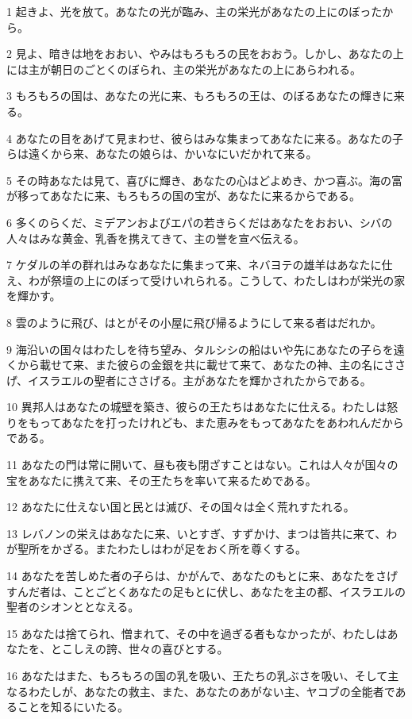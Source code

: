 \par 1 起きよ、光を放て。あなたの光が臨み、主の栄光があなたの上にのぼったから。
\par 2 見よ、暗きは地をおおい、やみはもろもろの民をおおう。しかし、あなたの上には主が朝日のごとくのぼられ、主の栄光があなたの上にあらわれる。
\par 3 もろもろの国は、あなたの光に来、もろもろの王は、のぼるあなたの輝きに来る。
\par 4 あなたの目をあげて見まわせ、彼らはみな集まってあなたに来る。あなたの子らは遠くから来、あなたの娘らは、かいなにいだかれて来る。
\par 5 その時あなたは見て、喜びに輝き、あなたの心はどよめき、かつ喜ぶ。海の富が移ってあなたに来、もろもろの国の宝が、あなたに来るからである。
\par 6 多くのらくだ、ミデアンおよびエパの若きらくだはあなたをおおい、シバの人々はみな黄金、乳香を携えてきて、主の誉を宣べ伝える。
\par 7 ケダルの羊の群れはみなあなたに集まって来、ネバヨテの雄羊はあなたに仕え、わが祭壇の上にのぼって受けいれられる。こうして、わたしはわが栄光の家を輝かす。
\par 8 雲のように飛び、はとがその小屋に飛び帰るようにして来る者はだれか。
\par 9 海沿いの国々はわたしを待ち望み、タルシシの船はいや先にあなたの子らを遠くから載せて来、また彼らの金銀を共に載せて来て、あなたの神、主の名にささげ、イスラエルの聖者にささげる。主があなたを輝かされたからである。
\par 10 異邦人はあなたの城壁を築き、彼らの王たちはあなたに仕える。わたしは怒りをもってあなたを打ったけれども、また恵みをもってあなたをあわれんだからである。
\par 11 あなたの門は常に開いて、昼も夜も閉ざすことはない。これは人々が国々の宝をあなたに携えて来、その王たちを率いて来るためである。
\par 12 あなたに仕えない国と民とは滅び、その国々は全く荒れすたれる。
\par 13 レバノンの栄えはあなたに来、いとすぎ、すずかけ、まつは皆共に来て、わが聖所をかざる。またわたしはわが足をおく所を尊くする。
\par 14 あなたを苦しめた者の子らは、かがんで、あなたのもとに来、あなたをさげすんだ者は、ことごとくあなたの足もとに伏し、あなたを主の都、イスラエルの聖者のシオンととなえる。
\par 15 あなたは捨てられ、憎まれて、その中を過ぎる者もなかったが、わたしはあなたを、とこしえの誇、世々の喜びとする。
\par 16 あなたはまた、もろもろの国の乳を吸い、王たちの乳ぶさを吸い、そして主なるわたしが、あなたの救主、また、あなたのあがない主、ヤコブの全能者であることを知るにいたる。
